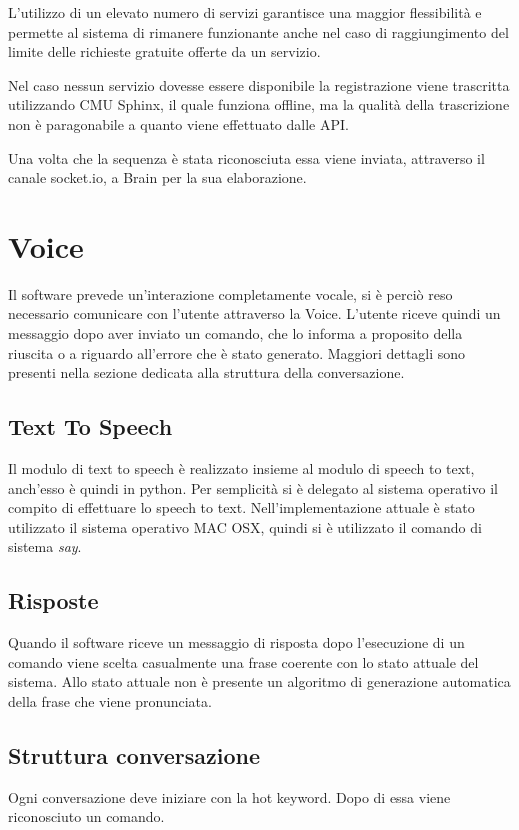 \documentclass[twoside]{supsistudent}
\begin{document}
L'utilizzo di un elevato numero di servizi garantisce una maggior flessibilità e permette al sistema di rimanere funzionante anche nel caso di raggiungimento del limite delle richieste gratuite offerte da un servizio.

Nel caso nessun servizio dovesse essere disponibile la registrazione viene trascritta utilizzando CMU Sphinx, il quale funziona offline, ma la qualità della trascrizione non è paragonabile a quanto viene effettuato dalle API.

Una volta che la sequenza è stata riconosciuta essa viene inviata, attraverso il canale socket.io, a Brain per la sua elaborazione.

\chapter{Voice}

Il software prevede un'interazione completamente vocale, si è perciò reso necessario comunicare con l'utente attraverso la Voice.
L'utente riceve quindi un messaggio dopo aver inviato un comando, che lo informa a proposito della riuscita o a riguardo all'errore che è stato generato. Maggiori dettagli sono presenti nella sezione dedicata alla struttura della conversazione.
\section{Text To Speech}
Il modulo di text to speech è realizzato insieme al modulo di speech to text, anch'esso è quindi in python. Per semplicità si è delegato al sistema operativo il compito di effettuare lo speech to text. Nell'implementazione attuale è stato utilizzato il sistema operativo MAC OSX, quindi si è utilizzato il comando di sistema \textit{say}.

\section{Risposte}
Quando il software riceve un messaggio di risposta dopo l'esecuzione di un comando viene scelta casualmente una frase coerente con lo stato attuale del sistema.
Allo stato attuale non è presente un algoritmo di generazione automatica della frase che viene pronunciata.
\section{Struttura conversazione}

Ogni conversazione deve iniziare con la hot keyword. Dopo di essa viene riconosciuto un comando.
\end{document}
